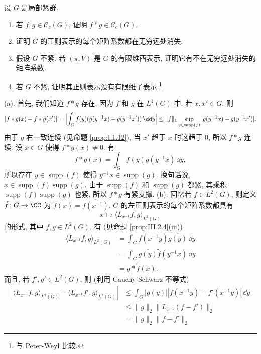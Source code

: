 \begin{exercise}[正则表示的矩阵系数]
\label{ex:III.6.1.2}
设 $G$ 是局部紧群.
\begin{enumerate}
\item[(a)] 若 $f, g \in \mathcal{C}_c(G)$, 证明 $f * g \in \mathcal{C}_c(G)$.
\item[(b)] 证明 $G$ 的正则表示的每个矩阵系数都在无穷远处消失.
\item[(c)] 假设 $G$ 不紧. 若 $(\pi, V)$ 是 $G$ 的有限维酉表示, 证明它有不在无穷远处消失的矩阵系数.
\item[(d)] 若 $G$ 不紧, 证明其正则表示没有有限维子表示.\footnote{与 Peter-Weyl 比较.}
\end{enumerate}
\end{exercise}

\begin{solution}
(a). 首先, 我们知道 $f * g$ 存在, 因为 $f$ 和 $g$ 在 $L^1(G)$ 中. 若 $x, x' \in G$, 则
\[
|f * g(x) - f * g(x')| = \Bigl|\int_G f(y)(g(y^{-1}x) - g(y^{-1}x'))\,\dd y\Bigr| \leq \|f\|_1\sup_{y \in \operatorname{supp}(f)}|g(y^{-1}x) - g(y^{-1}x')|.
\]
由于 $g$ 右一致连续 (见命题 \ref{prop:I.1.12}), 当 $x'$ 趋于 $x$ 时这趋于 $0$, 所以 $f * g$ 连续.
设 $x \in G$ 使得 $f * g(x) \neq 0$. 有
\[
f * g(x) = \int_G f(y)g(y^{-1}x)\,\dd y,
\]
所以存在 $y \in \operatorname{supp}(f)$ 使得 $y^{-1}x \in \operatorname{supp}(g)$. 换句话说, $x \in \operatorname{supp}(f)\operatorname{supp}(g)$. 由于 $\operatorname{supp}(f)$ 和 $\operatorname{supp}(g)$ 都紧, 其乘积 $\operatorname{supp}(f)\operatorname{supp}(g)$ 也紧, 所以 $f * g$ 有紧支撑.
(b). 回忆若 $f \in L^2(G)$, 则定义 $\tilde{f} \colon G \to \CC$ 为 $\tilde{f}(x) = \overline{f(x^{-1})}$.
$G$ 的左正则表示的每个矩阵系数都具有
\[
x \longmapsto \langle L_{x^{-1}}f, g \rangle_{L^2(G)}
\]
的形式, 其中 $f, g \in L^2(G)$. 有 (见命题 \ref{prop:III.2.4}(iii))
\begin{align*}
\langle L_{x^{-1}}f, g \rangle_{L^2(G)} &= \int_G f(x^{-1}y)\overline{g(y)}\,\dd y \\
&= \int_G \overline{g(y)}\tilde{f}(y^{-1}x)\,\dd y \\
&= g * \tilde{f}(x).
\end{align*}
而且, 若 $f', g' \in L^2(G)$, 则 (利用 Cauchy-Schwarz 不等式)
\begin{align*}
|\langle L_{x^{-1}}f, g \rangle_{L^2(G)} - \langle L_{x^{-1}}f', g \rangle_{L^2(G)}| &\leq \int_G |g(y)||f(x^{-1}y) - f'(x^{-1}y)|\,\dd y \\
&\leq \|g\|_2\|L_{x^{-1}}(f - f')\|_2 \\
&= \|g\|_2\|f - f'\|_2

\end{align*}
\end{solution}
